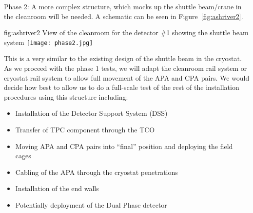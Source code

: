 Phase 2: A more complex structure, which mocks up the shuttle
beam/crane in the cleanroom will be needed. A schematic can be seen in
Figure~\ref{fig:ashriver2}.
\begin{dunefigure}{fig:ashriver2}
  {View of the cleanroom for the  detector \#1 showing the shuttle beam system}
  \texttt{[image: phase2.jpg]}
\end{dunefigure}
This is a very similar to the existing
design of the shuttle beam in the cryostat.  As we proceed with the
phase 1 tests, we will adapt the cleanroom rail system or cryostat
rail system to allow full movement of the APA and CPA pairs. We would
decide how best to allow us to do a full-scale test of the rest of the
installation procedures using this structure including:
\begin{itemize}
 \item Installation of the Detector Support System (DSS)
 \item Transfer of TPC component through the TCO
 \item Moving APA and CPA pairs into ``final'' position and deploying the field cages
 \item Cabling of the APA through the cryostat penetrations
 \item Installation of the end walls
 \item Potentially deployment of the Dual Phase detector
\end{itemize}
